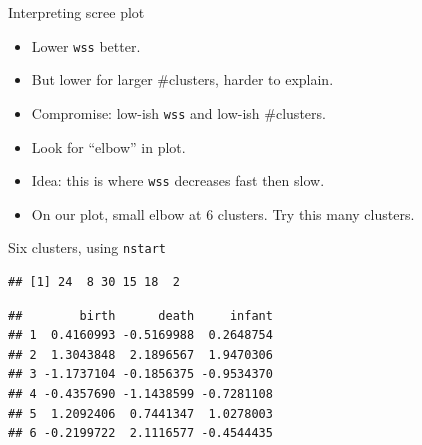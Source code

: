 \documentclass[ignorenonframetext,]{beamer}
\newenvironment{Shaded}{\begin{snugshade}}{\end{snugshade}}
\newcommand{\DataTypeTok}[1]{\textcolor[rgb]{0.13,0.29,0.53}{#1}}
\newcommand{\DecValTok}[1]{\textcolor[rgb]{0.00,0.00,0.81}{#1}}
\newcommand{\FloatTok}[1]{\textcolor[rgb]{0.00,0.00,0.81}{#1}}
\newcommand{\KeywordTok}[1]{\textcolor[rgb]{0.13,0.29,0.53}{\textbf{#1}}}
\newcommand{\NormalTok}[1]{#1}
\newcommand{\OperatorTok}[1]{\textcolor[rgb]{0.81,0.36,0.00}{\textbf{#1}}}
\newcommand{\StringTok}[1]{\textcolor[rgb]{0.31,0.60,0.02}{#1}}
\begin{document}
\begin{frame}[fragile]{Interpreting scree plot}
\protect\hypertarget{interpreting-scree-plot}{}

\begin{itemize}
\item
  Lower \texttt{wss} better.
\item
  But lower for larger \#clusters, harder to explain.
\item
  Compromise: low-ish \texttt{wss} and low-ish \#clusters.
\item
  Look for ``elbow'' in plot.
\item
  Idea: this is where \texttt{wss} decreases fast then slow.
\item
  On our plot, small elbow at 6 clusters. Try this many clusters.
\end{itemize}

\end{frame}

\begin{frame}[fragile]{Six clusters, using \texttt{nstart}}
\protect\hypertarget{six-clusters-using-nstart}{}

\begin{Shaded}
\end{Shaded}

\begin{verbatim}
## [1] 24  8 30 15 18  2
\end{verbatim}

\begin{Shaded}
\end{Shaded}

\begin{verbatim}
##        birth      death     infant
## 1  0.4160993 -0.5169988  0.2648754
## 2  1.3043848  2.1896567  1.9470306
## 3 -1.1737104 -0.1856375 -0.9534370
## 4 -0.4357690 -1.1438599 -0.7281108
## 5  1.2092406  0.7441347  1.0278003
## 6 -0.2199722  2.1116577 -0.4544435
\end{verbatim}

\begin{Shaded}
\end{Shaded}

\end{frame}
\end{document}
